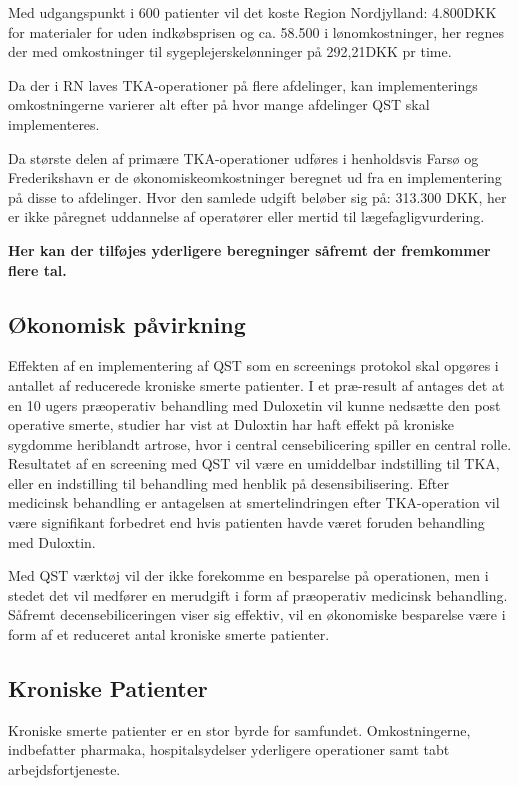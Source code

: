Med udgangspunkt i 600 patienter vil det koste Region Nordjylland: 4.800DKK for materialer for uden indkøbsprisen og ca. 58.500 i lønomkostninger, her regnes der med omkostninger til sygeplejerskelønninger på 292,21DKK pr time.\citep{DST1}\citep{DST2}

Da der i RN laves TKA-operationer på flere afdelinger, kan implementerings omkostningerne varierer alt efter på hvor mange afdelinger QST skal implementeres. 

Da største delen af primære TKA-operationer udføres i henholdsvis Farsø og Frederikshavn er de økonomiskeomkostninger beregnet ud fra en implementering på disse to afdelinger. Hvor den samlede udgift beløber sig på: 313.300 DKK, her er ikke påregnet uddannelse af operatører eller mertid til lægefagligvurdering.

\textbf{Her kan der tilføjes yderligere beregninger såfremt der fremkommer flere tal. }

\subsection{Økonomisk påvirkning}

Effekten af en implementering af QST som en screenings protokol skal opgøres i antallet af reducerede kroniske smerte patienter. I et præ-result af  antages det at en 10 ugers præoperativ behandling med Duloxetin vil kunne nedsætte den post operative smerte, studier har vist at Duloxtin har haft effekt på kroniske sygdomme heriblandt artrose, hvor i central censebilicering spiller en central rolle. \citep{Blikman2016} Resultatet af en screening med QST vil være en umiddelbar indstilling til TKA, eller en indstilling til behandling med henblik på desensibilisering. Efter medicinsk behandling er antagelsen at smertelindringen efter TKA-operation vil være signifikant forbedret end hvis patienten havde været foruden behandling med Duloxtin.

Med QST værktøj vil der ikke forekomme en besparelse på operationen, men i stedet det vil medfører en merudgift i form af præoperativ medicinsk behandling. Såfremt decensebiliceringen viser sig effektiv, vil en økonomiske besparelse være i form af et reduceret antal kroniske smerte patienter.

\subsection{Kroniske Patienter}

Kroniske smerte patienter er en stor byrde for samfundet. Omkostningerne, indbefatter pharmaka, hospitalsydelser yderligere operationer samt tabt arbejdsfortjeneste. 


